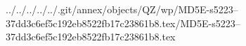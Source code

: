 ../../../../../.git/annex/objects/QZ/wp/MD5E-s5223--37dd3c6ef5c192eb8522fb17c23861b8.tex/MD5E-s5223--37dd3c6ef5c192eb8522fb17c23861b8.tex